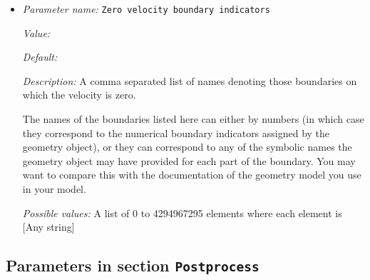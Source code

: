\begin{itemize}
{\it Value:} 


{\it Default:} 


{\it Description:} A comma separated list of names denoting those boundaries on which the velocity is tangential and unrestrained, i.e., free-slip where no external forces act to prescribe a particular tangential velocity (although there is a force that requires the flow to be tangential).

The names of the boundaries listed here can either by numbers (in which case they correspond to the numerical boundary indicators assigned by the geometry object), or they can correspond to any of the symbolic names the geometry object may have provided for each part of the boundary. You may want to compare this with the documentation of the geometry model you use in your model.


{\it Possible values:} A list of 0 to 4294967295 elements where each element is [Any string]
\item {\it Parameter name:} {\tt Zero velocity boundary indicators}
\label{parameters:Model settings/Zero velocity boundary indicators}


{\it Value:} 


{\it Default:} 


{\it Description:} A comma separated list of names denoting those boundaries on which the velocity is zero.

The names of the boundaries listed here can either by numbers (in which case they correspond to the numerical boundary indicators assigned by the geometry object), or they can correspond to any of the symbolic names the geometry object may have provided for each part of the boundary. You may want to compare this with the documentation of the geometry model you use in your model.


{\it Possible values:} A list of 0 to 4294967295 elements where each element is [Any string]
\end{itemize}

\subsection{Parameters in section \tt Postprocess}
\label{parameters:Postprocess}


